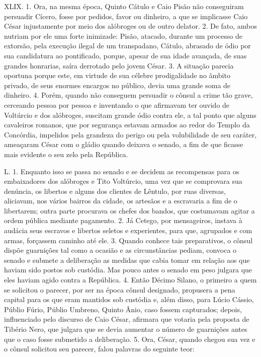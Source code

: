 XLIX. 1. Ora, na mesma época, Quinto Cátulo e Caio Pisão não conseguiram
persuadir Cícero, fosse por pedidos, favor ou dinheiro, a que se implicasse
Caio César injustamente por meio dos alóbroges ou de outro delator. 2. De fato,
ambos nutriam por ele uma forte inimizade: Pisão, atacado, durante um processo
de extorsão, pela execução ilegal de um transpadano, Cátulo, abrasado de ódio
por sua candidatura ao pontificado, porque, apesar de sua idade avançada, de
suas grandes honrarias, saíra derrotado pelo jovem César. 3. A situação parecia
oportuna porque este, em virtude de sua célebre prodigalidade no âmbito
privado, de seus enormes encargos no público, devia uma grande soma de
dinheiro. 4. Porém, quando não conseguem persuadir o cônsul a crime tão grave,
cerceando pessoa por pessoa e inventando o que afirmavam ter ouvido de
Voltúrcio e dos alóbroges, suscitam grande ódio contra ele, a tal ponto que
alguns cavaleiros romanos, que por segurança estavam armados ao redor do Templo
da Concórdia, impelidos pela grandeza do perigo ou pela volubilidade de seu caráter, ameaçaram César com o gládio quando deixava o senado, a fim de que
ficasse mais evidente o seu zelo pela República. 

L. 1. Enquanto isso se passa no senado e se decidem as recompensas para os
embaixadores dos alóbroges e Tito Voltúrcio, uma vez que se comprovara sua
denúncia, os libertos e alguns dos clientes de Lêntulo, por ruas diversas,
aliciavam, nos vários bairros da cidade, os artesãos e a escravaria a fim de o
libertarem; outra parte procurava os chefes dos bandos, que costumavam agitar a
ordem pública mediante pagamento. 2. Já Cetego, por mensageiros, instava à
audácia seus escravos e libertos seletos e experientes, para que, agrupados e
com armas, forçassem caminho até ele. 3. Quando conhece tais preparativos, o
cônsul dispõe guarnições tal como a ocasião e as circunstâncias pediam, convoca
o senado e submete a deliberação as medidas que cabia tomar em relação aos que
haviam sido postos sob custódia. Mas pouco antes o senado em peso julgara que
eles haviam agido contra a República. 4. Então Décimo Silano, o primeiro a quem
se solicitou o parecer, por ser na época cônsul designado, propusera a pena
capital para os que eram mantidos sob custódia e, além disso, para Lúcio
Cássio, Públio Fúrio, Públio Umbreno, Quinto Ânio, caso fossem capturados;
depois, influenciado pelo discurso de Caio César, afirmara que votaria pela
proposta de Tibério Nero, que julgara que se devia aumentar o número de
guarnições antes que o caso fosse submetido a deliberação. 5. Ora, César,
quando chegou sua vez e o cônsul solicitou seu parecer, falou palavras do
seguinte teor:

